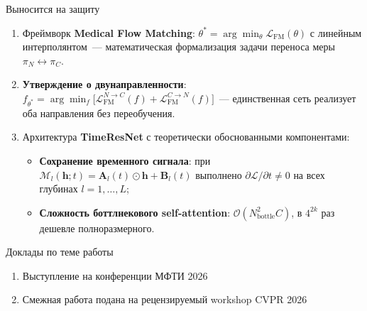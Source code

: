 \documentclass[11pt,aspectratio=169,xcolor=dvipsnames]{beamer}
\theoremstyle{definition}
\begin{document}

\begin{frame}{Выносится на защиту}
\small

\begin{enumerate}\setlength{\itemsep}{0.25em}
  \item Фреймворк \textbf{Medical Flow Matching}: $\theta^* = \arg\min_\theta \mathcal{L}_{\mathrm{FM}}(\theta)$ с линейным интерполянтом~--- математическая формализация задачи переноса меры $\pi_N \leftrightarrow \pi_C$.

  \item \textbf{Утверждение о двунаправленности}: $f_{\theta^*} = \arg\min_f \bigl[\mathcal{L}_{\mathrm{FM}}^{N\to C}(f) + \mathcal{L}_{\mathrm{FM}}^{C\to N}(f)\bigr]$~--- единственная сеть реализует оба направления без переобучения.

  \item Архитектура \textbf{TimeResNet} с теоретически обоснованными компонентами:
  \begin{itemize}\setlength{\itemsep}{0pt}
      \item \textbf{Сохранение временного сигнала}: при $\mathcal{M}_l(\mathbf{h}; t) = \mathbf{A}_l(t)\odot\mathbf{h} + \mathbf{B}_l(t)$ выполнено $\partial\mathcal{L}/\partial t \neq 0$ на всех глубинах $l = 1, \ldots, L$;
      \item \textbf{Сложность боттлнекового self-attention}: $\mathcal{O}(N_{\mathrm{bottle}}^2 C)$, в $4^{2k}$ раз дешевле полноразмерного.
  \end{itemize}
\end{enumerate}



\begin{block}{Доклады по теме работы}
\begin{enumerate}
  \item Выступление на конференции МФТИ 2026
  \item Смежная работа подана на рецензируемый workshop CVPR 2026
\end{enumerate}
\end{block}

\end{frame}
\end{document}
